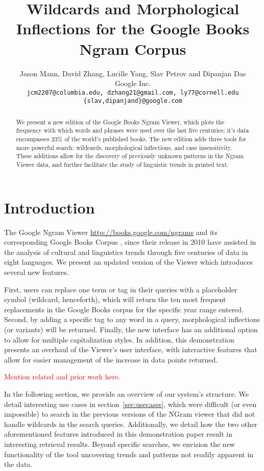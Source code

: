 \documentclass[11pt]{article}
\title{Wildcards and Morphological Inflections for the Google Books Ngram Corpus}
\author{Jason Mann, David Zhang, Lucille Yang, Slav Petrov and Dipanjan Das\\
	Google Inc. \\
	{\tt jcm2207@columbia.edu, dzhang21@gmail.com, ly77@cornell.edu}\\
	{\tt \{slav,dipanjand\}@google.com}}
\date{}
\begin{document}
\maketitle

\begin{abstract}

We present a new edition of the Google Books Ngram Viewer, which plots
the frequency with which words and phrases were used over the last five
centuries; it's data encompasses 23\% of the world's published books.
The new edition adds three tools for more powerful search: wildcards,
morphological inflections, and case insensitivity. These additions allow
for the discovery of previously unknown patterns in the Ngram Viewer data,
and further facilitate the study of linguistic trends in printed text.

\end{abstract}

\section{Introduction}

The Google Ngram Viewer \url{http://books.google.com/ngrams} and its corresponding Google Books Corpus \cite{culturomics}, since their release in 2010 have assisted in the analysis of cultural and linguistics trends through five centuries of data in eight languages. We present an updated version of the Viewer which introduces several new features. 

First, users can replace one term or tag in their queries with a placeholder symbol (wildcard, henceforth), which will return the ten most frequent replacements in the Google Books corpus for the specific year range entered. Second, by adding a specific tag to any word in a query, morphological inflections (or variants) will be returned. Finally, the new interface has an additional option to allow for multiple capitalization styles. In addition, this demonstration presents an overhaul of the Viewer's user interface, with interactive features that allow for easier management of the increase in data points returned.

\vspace{1em}
\textcolor{red}{Mention related and prior work here.}
\vspace{1em}

In the following section, we provide an overview of our system's structure. We detail interesting use cases in section~\ref{sec:usecases}, which were difficult (or even impossible) to search in the previous versions of the NGram viewer that did not handle wildcards in the search queries. Additionally, we detail how the two other aforementioned features introduced in this demonstration paper result in interesting retrieval results. Beyond specific searches, we envision the new functionality of the tool uncovering trends and patterns not readily apparent in the data.
\end{document}
